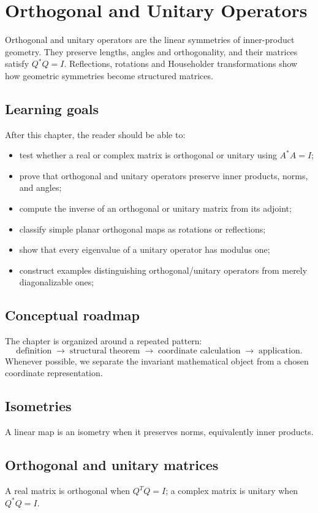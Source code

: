 \chapter{Orthogonal and Unitary Operators}
\label{ch:i15-orthogonal-and-unitary-operators}

Orthogonal and unitary operators are the linear symmetries of inner-product geometry. They preserve lengths, angles and orthogonality, and their matrices satisfy $Q^*Q=I$. Reflections, rotations and Householder transformations show how geometric symmetries become structured matrices.

\section*{Learning goals}
After this chapter, the reader should be able to:
\begin{itemize}
\item test whether a real or complex matrix is orthogonal or unitary using \(A^*A=I\);
\item prove that orthogonal and unitary operators preserve inner products, norms, and angles;
\item compute the inverse of an orthogonal or unitary matrix from its adjoint;
\item classify simple planar orthogonal maps as rotations or reflections;
\item show that every eigenvalue of a unitary operator has modulus one;
\item construct examples distinguishing orthogonal/unitary operators from merely diagonalizable ones;
\end{itemize}
\section*{Conceptual roadmap}
The chapter is organized around a repeated pattern:
\[
\boxed{\text{definition}\;\longrightarrow\;\text{structural theorem}\;\longrightarrow\;\text{coordinate calculation}\;\longrightarrow\;\text{application}.}
\]
Whenever possible, we separate the invariant mathematical object from a chosen coordinate representation.

\section{Isometries}
A linear map is an isometry when it preserves norms, equivalently inner products.

\section{Orthogonal and unitary matrices}
A real matrix is orthogonal when $Q^TQ=I$; a complex matrix is unitary when $Q^*Q=I$.


